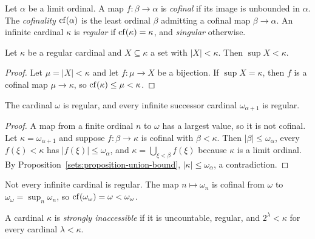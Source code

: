 \begin{definition}\label{sets:definition-cofinality}
Let $\alpha$ be a limit ordinal. A map $f \colon \beta \to \alpha$ is
\emph{cofinal} if its image is unbounded in $\alpha$. The \emph{cofinality}
$\operatorname{cf}(\alpha)$ is the least ordinal $\beta$ admitting a cofinal map
$\beta \to \alpha$. An infinite cardinal $\kappa$ is \emph{regular} if
$\operatorname{cf}(\kappa) = \kappa$, and \emph{singular} otherwise.
\end{definition}

\begin{lemma}\label{sets:lemma-regular-sup}
Let $\kappa$ be a regular cardinal and $X \subseteq \kappa$ a set with
$|X| < \kappa$. Then $\sup X < \kappa$.
\end{lemma}

\begin{proof}
Let $\mu = |X| < \kappa$ and let $f \colon \mu \to X$ be a bijection. If
$\sup X = \kappa$, then $f$ is a cofinal map $\mu \to \kappa$, so
$\operatorname{cf}(\kappa) \leq \mu < \kappa$.
\end{proof}

\begin{proposition}\label{sets:proposition-regular-cardinals}
The cardinal $\omega$ is regular, and every infinite successor cardinal
$\omega_{\alpha + 1}$ is regular.
\end{proposition}

\begin{proof}
A map from a finite ordinal $n$ to $\omega$ has a largest value, so it is not
cofinal. Let $\kappa = \omega_{\alpha + 1}$ and suppose $f \colon \beta \to \kappa$ is
cofinal with $\beta < \kappa$. Then $|\beta| \leq \omega_\alpha$, every
$f(\xi) < \kappa$ has $|f(\xi)| \leq \omega_\alpha$, and
$\kappa = \bigcup_{\xi < \beta} f(\xi)$ because $\kappa$ is a limit ordinal. By
Proposition~\ref{sets:proposition-union-bound}, $|\kappa| \leq \omega_\alpha$, a
contradiction.
\end{proof}

\begin{counterexample}\label{sets:counterexample-singular}
Not every infinite cardinal is regular. The map $n \mapsto \omega_n$ is
cofinal from $\omega$ to $\omega_\omega = \sup_n \omega_n$, so
$\operatorname{cf}(\omega_\omega) = \omega < \omega_\omega$.
\end{counterexample}

\begin{definition}\label{sets:definition-inaccessible}
A cardinal $\kappa$ is \emph{strongly inaccessible} if it is uncountable,
regular, and $2^\lambda < \kappa$ for every cardinal $\lambda < \kappa$.
\end{definition}

